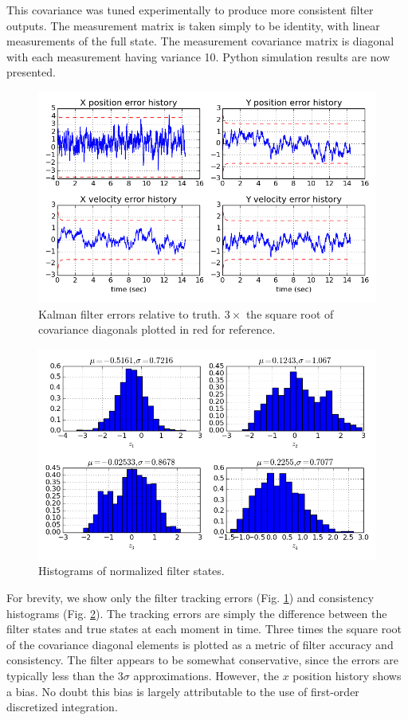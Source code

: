 This covariance was tuned experimentally to produce more consistent filter outputs.
The measurement matrix is taken simply to be identity, with linear measurements of the full state.
The measurement covariance matrix is diagonal with each measurement having variance 10.
Python simulation results are now presented.

\begin{figure}[tb!]
\centering
\includegraphics[width=\textwidth]{kf_errors}
\caption{Kalman filter errors relative to truth. $3\times$ the square root of covariance diagonals plotted in red for reference.}
\label{fig:kf_errors}
\end{figure}

\begin{figure}[tb!]
\centering
\includegraphics[width=\textwidth]{kf_consistency}
\caption{Histograms of normalized filter states.}
\label{fig:kf_consistency}
\end{figure}

For brevity, we show only the filter tracking errors (Fig. \ref{fig:kf_errors}) and consistency histograms (Fig. \ref{fig:kf_consistency}).
The tracking errors are simply the difference between the filter states and true states at each moment in time.
Three times the square root of the covariance diagonal elements is plotted as a metric of filter accuracy and consistency.
The filter appears to be somewhat conservative, since the errors are typically less than the $3\sigma$ approximations.
However, the $x$ position history shows a bias.
No doubt this bias is largely attributable to the use of first-order discretized integration.

